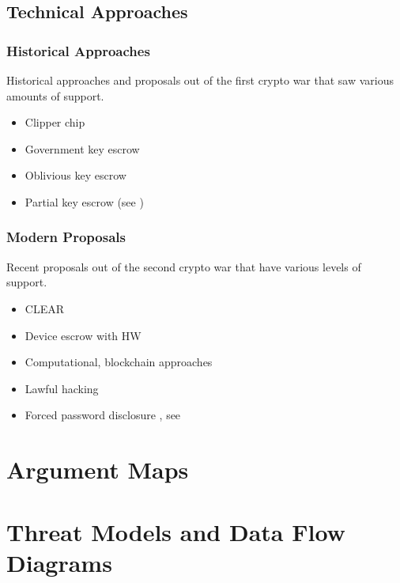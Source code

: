 \subsection{Technical Approaches}
\label{sec-tech-approaches}

\subsubsection*{Historical Approaches}

Historical approaches and proposals out of the first crypto war that saw various amounts of support.

\begin{itemize}
    \item Clipper chip
    \item Government key escrow
    \item Oblivious key escrow \cite{goos_oblivious_1996}
    \item Partial key escrow (see \cite{denning_taxonomy_1996})
\end{itemize}

\subsubsection*{Modern Proposals}

Recent proposals out of the second crypto war that have various levels of support.

\begin{itemize}
    \item CLEAR \cite{ozzie_2018}
    \item Device escrow with HW \cite{savage_lawful_2018}
    \item Computational, blockchain approaches \cite{phan_key_2017}
    \item Lawful hacking \cite{nguyen_lawful_2017} \cite{soesanto_2018}
    \item Forced password disclosure \cite{bittenbender_2019}, see \cite{kerr_encryption_2017}
\end{itemize}

\section{Argument Maps}
\label{sec-arg-maps-intro}

\section{Threat Models and Data Flow Diagrams}
\label{sec-threat-model-intro}
